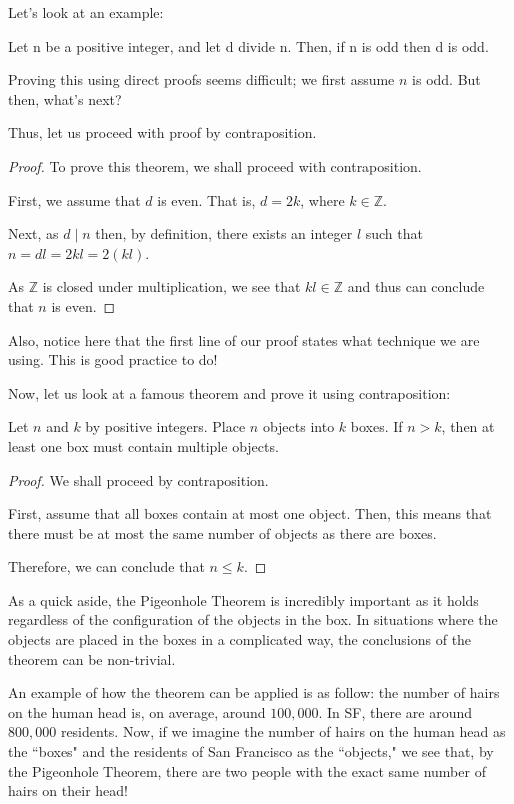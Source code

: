 \documentclass[openany]{book}
\begin{document}
Let's look at an example:
\begin{thm}
	Let n be a positive integer, and let d divide n. Then, if n is odd then d is odd.
\end{thm}

Proving this using direct proofs seems difficult; we first assume $n$ is odd. But then, what's next?

Thus, let us proceed with proof by contraposition.

\begin{proof}
	To prove this theorem, we shall proceed with contraposition.
	
	First, we assume that $d$ is even. That is, $d=2k$, where $k\in\mathbb{Z}$.
	
	Next, as $d\mid n$ then, by definition, there exists an integer $l$ such that $n=dl=2kl=2(kl)$. 
	
	As $\mathbb{Z}$ is closed under multiplication, we see that $kl\in\mathbb{Z}$ and thus can conclude that $n$ is even.
\end{proof}

Also, notice here that the first line of our proof states what technique we are using. This is good practice to do!

Now, let us look at a famous theorem and prove it using contraposition:
\begin{theorem}
	Let $n$ and $k$ by positive integers. Place $n$ objects into $k$ boxes. If $n>k$, then at least one box must contain multiple objects.
\end{theorem}
\begin{proof}
	We shall proceed by contraposition.
	
	First, assume that all boxes contain at most one object. Then, this means that there must be at most the same number of objects as there are boxes.
	
	Therefore, we can conclude that $n\leq k$.
\end{proof}

As a quick aside, the Pigeonhole Theorem is incredibly important as it holds regardless of the configuration of the objects in the box. In situations where the objects are placed in the boxes in a complicated way, the conclusions of the theorem can be non-trivial.

An example of how the theorem can be applied is as follow: the number of hairs on the human head is, on average, around $100,000$. In SF, there are around $800,000$ residents. Now, if we imagine the number of hairs on the human head as the ``boxes" and the residents of San Francisco as the ``objects," we see that, by the Pigeonhole Theorem, there are two people with the exact same number of hairs on their head! 
\end{document}
